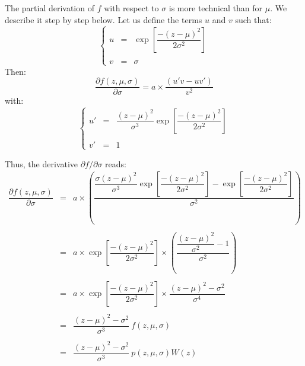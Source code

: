 The partial derivation of $f$ with respect to $\sigma$ is more technical than for $\mu$. We describe it step by step below.
Let us define the terms $u$ and $v$ such that:
\begin{equation}
\left\{
\begin{array}{rcl}
u & = & \exp \left[\dfrac{-(z-\mu)^2}{2\sigma^2} \right]\\\\
v & = & \sigma
\end{array}
\right.
\end{equation}
Then:
\begin{equation}
\dfrac{\partial f(z,\mu,\sigma)}{\partial \sigma} = a \times \dfrac{(u'v-uv')}{v^2}
\end{equation}
with:
\begin{equation}
\left\{
\begin{array}{rcl}
u' & = & \dfrac{(z-\mu)^2}{\sigma^3} \exp \left[\dfrac{-(z-\mu)^2}{2\sigma^2} \right]\\\\
v' & = & 1
\end{array}
\right.
\end{equation}

Thus, the derivative $\partial f/\partial \sigma$ reads:
\begin{equation}
\begin{array}{rcl}
\dfrac{\partial f(z,\mu,\sigma)}{\partial \sigma} & = & a \times \left( \dfrac{\dfrac{\sigma(z-\mu)^2}{\sigma^3} \exp \left[\dfrac{-(z-\mu)^2}{2\sigma^2}\right] - \exp \left[\dfrac{-(z-\mu)^2}{2\sigma^2}\right]}{\sigma^2}\right)\\\\
& = & a \times \exp \left[\dfrac{-(z-\mu)^2}{2\sigma^2}\right] \times \left( \dfrac{\dfrac{(z-\mu)^2}{\sigma^2} - 1}{\sigma^2}\right)\\\\
& = & a \times \exp \left[\dfrac{-(z-\mu)^2}{2\sigma^2}\right] \times \dfrac{(z-\mu)^2-\sigma^2}{\sigma^4}\\\\
& = & \dfrac{(z-\mu)^2-\sigma^2}{\sigma^3}\ f(z,\mu,\sigma)\\\\
& = & \dfrac{(z-\mu)^2-\sigma^2}{\sigma^3}\ p(z,\mu,\sigma)W(z)\\\\
\end{array}
\label{eq:part1:sigma_derivative}
\end{equation}

